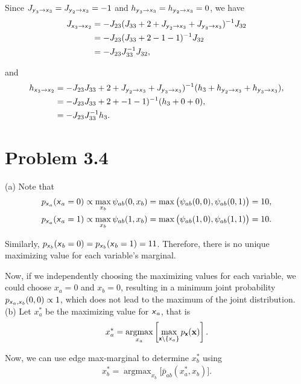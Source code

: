 \documentclass{article}
\newcommand{\s}[1]{\textsf{\textit{#1}}}
\newcommand{\bs}[1]{\textsf{\textbf{#1}}}
\newcommand{\qeds}{\hfill\qedsymbol}
\newcommand{\bm}{\mathbf}
\DeclareMathOperator*{\argmax}{argmax}
\begin{document}
Since $J_{\s{y}_3\to\s{x}_3} = J_{\s{y}_2\to\s{x}_3} = -1$
and $h_{\s{y}_3\to\s{x}_3} = h_{\s{y}_2\to\s{x}_3} = 0$, we have
\begin{align*}
	J_{\s{x}_3\to\s{x}_2} &= -J_{23}(J_{33} + 2 + 
	J_{\s{y}_2\to\s{x}_3} + J_{\s{y}_3\to\s{x}_3})^{-1}J_{32}\\
	& = -J_{23}(J_{33} + 2 -1 -1)^{-1}J_{32}\\
	& = -J_{23}J_{33}^{-1}J_{32},
\end{align*}

and
\begin{align*}
	h_{\s{x}_3\to\s{x}_2} &= -J_{23}J_{33} + 2 + 
	J_{\s{y}_2\to\s{x}_3} + J_{\s{y}_3\to\s{x}_3})^{-1}
	(h_3+h_{\s{y}_2\to\s{x}_3} + h_{\s{y}_3\to\s{x}_3}),\\
	&= -J_{23}J_{33} + 2 + 
	-1 -1)^{-1}
	(h_3+0 + 0),\\
	&=-J_{23}J_{33}^{-1}h_{3}.
\end{align*}
\pagebreak

\section*{Problem 3.4}
(a) Note that
\begin{align*}
	p_{\s{x}_a}(\s{x}_a = 0) &\propto \max_{x_b}\psi_{ab}(0, x_b) = \max\big(\psi_{ab}(0, 0), \psi_{ab}(0, 1)\big) = 10,\\
	p_{\s{x}_a}(\s{x}_a = 1) &\propto \max_{x_b}\psi_{ab}(1, x_b) = \max\big(\psi_{ab}(1, 0),  \psi_{ab}(1, 1)\big) = 10.
\end{align*}

Similarly, $p_{\s{x}_b}(\s{x}_b = 0) = p_{\s{x}_b}(\s{x}_b = 1) = 11$. Therefore, there is no unique maximizing value for each variable's marginal.

Now, if we independently choosing the maximizing values for each variable, we could choose $x_a=0$ and $x_b=0$, resulting in a minimum joint probability $p_{\s{x}_a, \s{x}_b}(0,0) \propto 1$, which does not lead to the maximum of the joint distribution. \qeds
\\

\noindent
(b) Let $x_a^*$ be the maximizing value for $\s{x}_a$, that is
\begin{align*}
	x_a^* = \argmax_{x_a} \left[\max_{\bs{x}\backslash\{\s{x}_a\}}p_{\bs{x}}(\bm{x}) \right].
\end{align*}
%

Now, we can use edge max-marginal to determine $x_b^*$ using
\begin{align*}
	x_b^* = \argmax_{x_b} \bigg[\bar{p}_{ab}(x_a^*, x_b)\bigg].
\end{align*}
%
\end{document}
